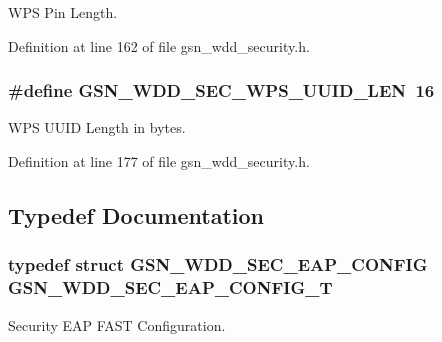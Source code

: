 WPS Pin Length. 



Definition at line 162 of file gsn\_\-wdd\_\-security.h.

\hypertarget{a00604_afe238c1f37fdcbfd10782721ac17bdfa}{
\subsubsection[{GSN\_\-WDD\_\-SEC\_\-WPS\_\-UUID\_\-LEN}]{\setlength{\rightskip}{0pt plus 5cm}\#define GSN\_\-WDD\_\-SEC\_\-WPS\_\-UUID\_\-LEN~16}}
\label{a00604_afe238c1f37fdcbfd10782721ac17bdfa}


WPS UUID Length in bytes. 



Definition at line 177 of file gsn\_\-wdd\_\-security.h.



\subsection{Typedef Documentation}
\hypertarget{a00604_ae505f6660ee9d5572054b161a620bc52}{
\subsubsection[{GSN\_\-WDD\_\-SEC\_\-EAP\_\-CONFIG\_\-T}]{\setlength{\rightskip}{0pt plus 5cm}typedef struct {\bf GSN\_\-WDD\_\-SEC\_\-EAP\_\-CONFIG}  {\bf GSN\_\-WDD\_\-SEC\_\-EAP\_\-CONFIG\_\-T}}}
\label{a00604_ae505f6660ee9d5572054b161a620bc52}


Security EAP FAST Configuration. 

